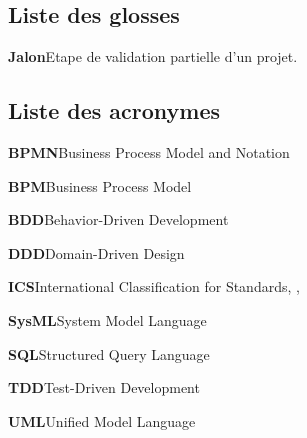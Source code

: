 \documentclass[a4paper,12pt]{article}
\begin{document}
\subsection{Liste des glosses}
\label{sec:org926ae8e}
\textbf{\hypertarget{gls-25}{Jalon}}\hspace*{1em}Etape de validation partielle d'un projet.\hspace*{.5em}\pageref{gls-1-use-1}
\subsection{Liste des acronymes}
\label{sec:orgc9787c8}
\textbf{\hypertarget{gls-80}{BPMN}}\hspace*{1em}Business Process Model and Notation\hspace*{.5em}\pageref{gls-7-use-1}

\textbf{\hypertarget{gls-79}{BPM}}\hspace*{1em}Business Process Model\hspace*{.5em}\pageref{gls-6-use-1}

\textbf{\hypertarget{gls-69}{BDD}}\hspace*{1em}Behavior-Driven Development\hspace*{.5em}\pageref{gls-3-use-1}

\textbf{\hypertarget{gls-121}{DDD}}\hspace*{1em}Domain-Driven Design\hspace*{.5em}\pageref{gls-5-use-1}

\textbf{\hypertarget{gls-185}{ICS}}\hspace*{1em}International Classification for Standards\hspace*{.5em}\pageref{gls-10-use-1}, \pageref{gls-10-use-2}, \pageref{gls-10-use-3}

\textbf{\hypertarget{gls-330}{SysML}}\hspace*{1em}System Model Language\hspace*{.5em}\pageref{gls-9-use-1}

\textbf{\hypertarget{gls-322}{SQL}}\hspace*{1em}Structured Query Language\hspace*{.5em}\pageref{gls-2-use-1}

\textbf{\hypertarget{gls-332}{TDD}}\hspace*{1em}Test-Driven Development\hspace*{.5em}\pageref{gls-4-use-1}

\textbf{\hypertarget{gls-337}{UML}}\hspace*{1em}Unified Model Language\hspace*{.5em}\pageref{gls-8-use-1}
\end{document}
